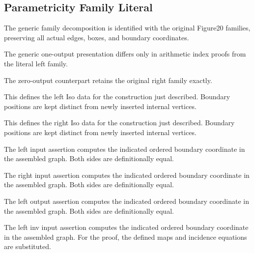 \subsection{Parametricity Family Literal}
The generic family decomposition is identified with the original Figure20 families, preserving all actual edges, boxes, and boundary coordinates.

The generic one-output presentation differs only in arithmetic index proofs from the literal left family.
\par{}

The zero-output counterpart retains the original right family exactly.
\par{}

This defines the left Iso data for the construction just described. Boundary positions are kept distinct from newly inserted internal vertices.
\par{}

This defines the right Iso data for the construction just described. Boundary positions are kept distinct from newly inserted internal vertices.
\par{}

The left input assertion computes the indicated ordered boundary coordinate in the assembled graph.
Both sides are definitionally equal.
\par{}

The right input assertion computes the indicated ordered boundary coordinate in the assembled graph.
Both sides are definitionally equal.
\par{}

The left output assertion computes the indicated ordered boundary coordinate in the assembled graph.
Both sides are definitionally equal.
\par{}

The left inv input assertion computes the indicated ordered boundary coordinate in the assembled graph.
For the proof, the defined maps and incidence equations are substituted.
\par{}

